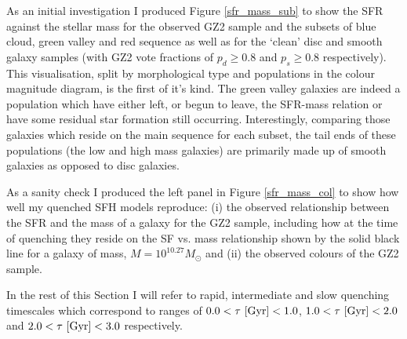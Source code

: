 \documentclass{mn2e}
\begin{document}
As an initial investigation I produced Figure \ref{sfr_mass_sub} to show the SFR against the stellar mass for the observed GZ2 sample and the subsets of blue cloud, green valley and red sequence as well as for the `clean' disc and smooth galaxy samples (with GZ2 vote fractions of $p_d \geq 0.8$ and $p_s \geq 0.8$ respectively). This visualisation, split by morphological type and populations in the colour magnitude diagram, is the first of it's kind. The green valley galaxies are indeed a population which have either left, or begun to leave, the SFR-mass relation or have some residual star formation still occurring. Interestingly, comparing those galaxies which reside on the main sequence for each subset, the tail ends of these populations (the low and high mass  galaxies) are primarily made up of smooth galaxies as opposed to disc galaxies.

As a sanity check I produced the left panel in Figure \ref{sfr_mass_col} to show how well my quenched SFH models reproduce: (i) the observed relationship between the SFR and the mass of a galaxy for the GZ2 sample, including how at the time of quenching they reside on the SF vs. mass relationship shown by the solid black line for a galaxy of mass, $M = 10^{10.27} M_{\odot}$ and (ii) the observed colours of the GZ2 sample. 

%

In the rest of this Section I will refer to rapid, intermediate and slow quenching timescales which correspond to ranges of $0.0 < \tau ~\rm{[Gyr]} < 1.0$, $1.0 < \tau ~\rm{[Gyr]} < 2.0$ and $2.0 < \tau ~\rm{[Gyr]} < 3.0$ respectively.
 
\end{document}
